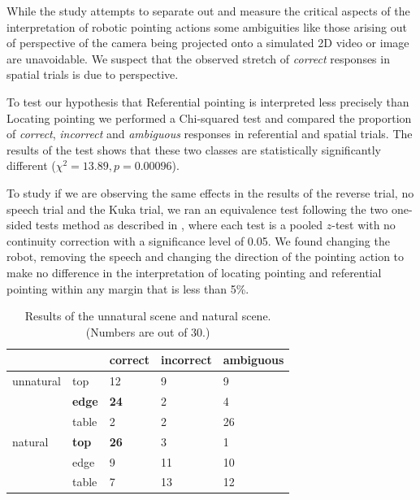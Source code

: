 \documentclass[letterpaper]{article} %
\begin{document}
While the study attempts to separate out and measure the critical aspects of the interpretation of robotic pointing actions some ambiguities like those arising out of perspective of the camera being projected onto a simulated 2D video or image are unavoidable. We suspect that the observed stretch of \textit{correct} responses in spatial trials is due to perspective.

To test our hypothesis that Referential pointing is interpreted less precisely than Locating pointing we performed a Chi-squared test and compared the proportion of \textit{correct}, \textit{incorrect} and \textit{ambiguous} responses in referential and spatial trials. The results of the test shows that these two classes are statistically significantly different ($\chi^2= 13.89, p = 0.00096$).

To study if we are observing the same effects in the results of the reverse trial, no speech trial and the Kuka trial, we ran an equivalence test following the two one-sided tests method as described in \cite{lakens2017equivalence}, where each test is a pooled $z$-test with no continuity
correction with a significance level of 0.05. We found changing the robot, removing the speech and changing the direction of the pointing action to make no difference in the interpretation of locating pointing and referential pointing within any margin that is less than 5\%.


\begin{table}[h]
\label{tab:naturaltrial}
\begin{tabular}{lllll}
          &               & correct     & incorrect & ambiguous \\ \hline
unnatural & top           & 12          & 9         & 9         \\
          & \textbf{edge} & \textbf{24} & 2         & 4         \\
          & table         & 2           & 2         & 26        \\ \hline
natural   & \textbf{top}  & \textbf{26} & 3         & 1         \\
          & edge          & 9           & 11        & 10        \\
          & table         & 7           & 13        & 12        \\ \hline
\end{tabular}
\caption{Results of the unnatural scene and natural scene. (Numbers are out of 30.)}
\label{tab:natural-unnatural}
\end{table}
\end{document}
